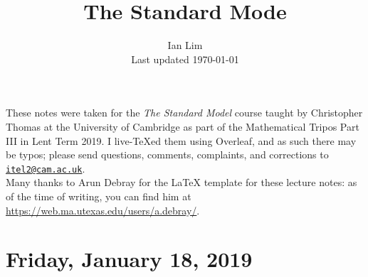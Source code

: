 \documentclass[reqno]{amsart}
\begin{document}
\title{The Standard Mode}
\author{Ian Lim\\ Last updated \today}
\maketitle
{\small\noindent These notes were taken for the \textit{The Standard Model} course taught by Christopher Thomas at the University of Cambridge as part of the Mathematical Tripos Part III in Lent Term 2019. I live-\TeX ed them using Overleaf, and as such there may be typos; please send questions, comments, complaints, and corrections to 
\href{mailto:itel2@cam.ac.uk?subject=SM\%20Lecture\%20Notes}{\texttt{itel2@cam.ac.uk}}.\\
Many thanks to Arun Debray for the {\LaTeX} template for these lecture notes: as of the time of writing, you can find him at \url{https://web.ma.utexas.edu/users/a.debray/}.}

\tableofcontents

\section{Friday, January 18, 2019}
	
\end{document}
